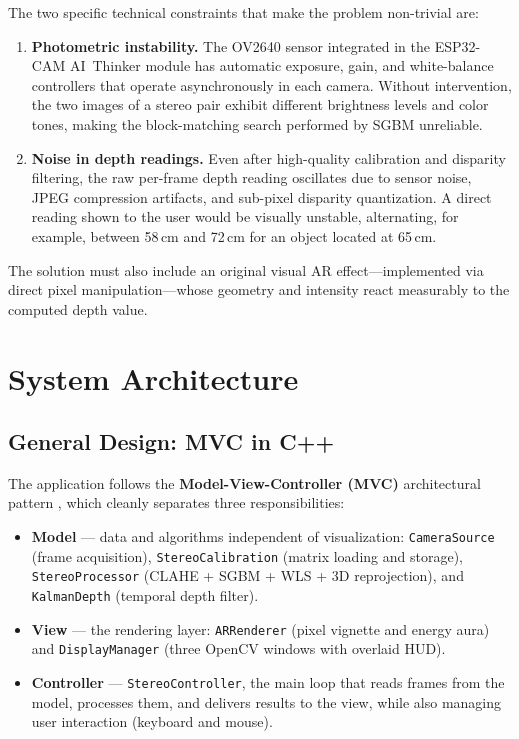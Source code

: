 \documentclass[12pt, a4paper]{article}
\begin{document}
The two specific technical constraints that make the problem non-trivial are:

\begin{enumerate}
  \item \textbf{Photometric instability.} The OV2640 sensor integrated in the
        ESP32-CAM AI~Thinker module has automatic exposure, gain, and white-balance
        controllers that operate asynchronously in each camera. Without intervention,
        the two images of a stereo pair exhibit different brightness levels and color
        tones, making the block-matching search performed by SGBM unreliable.
  \item \textbf{Noise in depth readings.} Even after high-quality calibration and
        disparity filtering, the raw per-frame depth reading oscillates due to sensor
        noise, JPEG compression artifacts, and sub-pixel disparity quantization.
        A direct reading shown to the user would be visually unstable, alternating,
        for example, between 58\,cm and 72\,cm for an object located at 65\,cm.
\end{enumerate}

The solution must also include an original visual AR effect---implemented via direct
pixel manipulation---whose geometry and intensity react measurably to the computed
depth value.

\section{System Architecture}

\subsection{General Design: MVC in C++}

The application follows the \textbf{Model-View-Controller (MVC)} architectural
pattern \cite{gamma1994design}, which cleanly separates three responsibilities:

\begin{itemize}[leftmargin=2em]
  \item \textbf{Model} --- data and algorithms independent of visualization:
        \texttt{CameraSource} (frame acquisition), \texttt{StereoCalibration}
        (matrix loading and storage), \texttt{StereoProcessor}
        (CLAHE + SGBM + WLS + 3D reprojection), and \texttt{KalmanDepth}
        (temporal depth filter).
  \item \textbf{View} --- the rendering layer: \texttt{ARRenderer}
        (pixel vignette and energy aura) and \texttt{DisplayManager}
        (three OpenCV windows with overlaid HUD).
  \item \textbf{Controller} --- \texttt{StereoController}, the main loop that reads
        frames from the model, processes them, and delivers results to the view,
        while also managing user interaction (keyboard and mouse).
\end{itemize}
\end{document}
